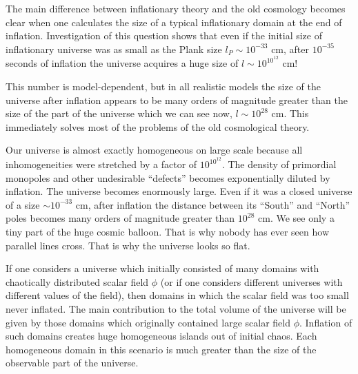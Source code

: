 \documentclass[a4paper,12pt]{article}
\begin{document}
The main difference between inflationary theory and the old cosmology
becomes clear when one calculates the size of a typical inflationary
domain at the end of inflation. Investigation of this question    shows
that even if  the initial size of   inflationary universe  was as small
as the Plank size $l_P \sim 10^{-33}$ cm, after $10^{-35}$ seconds of
inflation   the universe acquires a huge size of   $l \sim 10^{10^{12}}$
cm!


This number is model-dependent, but in all realistic models the  size of
the universe after inflation appears to be many orders of magnitude
greater than the size of the part of the universe which we can see now,
$l \sim 10^{28}$ cm. This immediately solves most of the problems of the
old cosmological theory.

Our universe is almost exactly homogeneous on  large scale because all
inhomogeneities were stretched by a factor of $10^{10^{12}}$.  The
density of  primordial monopoles  and other undesirable ``defects''
becomes exponentially diluted by inflation.   The universe   becomes
enormously large. Even if it was a closed universe of a size
 $\sim 10^{-33}$ cm, after inflation the distance between its ``South'' and
``North'' poles becomes many orders of magnitude greater than $10^{28}$
cm. We see only a tiny part of the huge cosmic balloon. That is why
nobody  has ever seen how parallel lines cross. That is why the universe
looks so flat.

If one considers a universe which initially consisted of many domains
with chaotically distributed scalar field  $\phi$ (or if one considers
different universes with different values of the field), then  domains in
which the scalar field was too small never inflated. The main
contribution to the total volume of the universe will be given by those
domains which originally contained large scalar field $\phi$. Inflation
of such domains creates huge homogeneous islands out of initial chaos.
Each  homogeneous domain in this scenario is much greater than the size
of the observable part of the universe.
\end{document}
